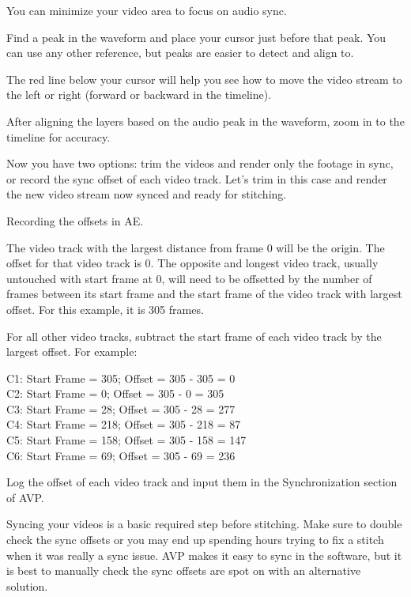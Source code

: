 \begin{fullwidth}

You can minimize your video area to focus on audio sync.

Find a peak in the waveform and place your cursor just before that peak. You can use any other reference, but peaks are easier to detect and align to.


The red line below your cursor will help you see how to move the video stream to the left or right (forward or backward in the timeline). 

After aligning the layers based on the audio peak in the waveform, zoom in to the timeline for accuracy.


Now you have two options: trim the videos and render only the footage in sync, or record the sync offset of each video track. Let’s trim in this case and render the new video stream now synced and ready for stitching.


{\large Recording the offsets in AE. \par}

The video track with the largest distance from frame 0 will be the origin. The offset for that video track is 0. The opposite and longest video track, usually untouched with start frame at 0, will need to be offsetted by the number of frames between its start frame and the start frame of the video track with largest offset. For this example, it is 305 frames.


For all other video tracks, subtract the start frame of each video track by the largest offset. For example: 

C1: Start Frame = 305; Offset = 305 - 305 = 0
\\
C2: Start Frame = 0; Offset = 305 - 0 = 305
\\
C3: Start Frame = 28; Offset = 305 - 28 = 277
\\
C4: Start Frame = 218; Offset = 305 - 218 = 87
\\
C5: Start Frame = 158; Offset = 305 - 158 = 147
\\
C6: Start Frame = 69; Offset = 305 - 69 = 236

Log the offset of each video track and input them in the Synchronization section of AVP.

Syncing your videos is a basic required step before stitching. Make sure to double check the sync offsets or you may end up spending hours trying to fix a stitch when it was really a sync issue. AVP makes it easy to sync in the software, but it is best to manually check the sync offsets are spot on with an alternative solution.


\clearpage
\end{fullwidth}
